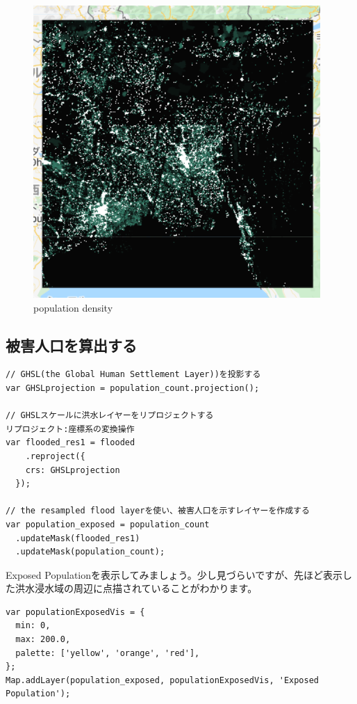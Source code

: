 \documentclass[
]{book}
\begin{document}
\begin{figure}
\centering
\includegraphics{images/population.png}
\caption{population density}
\end{figure}

\hypertarget{ux88abux5bb3ux4ebaux53e3ux3092ux7b97ux51faux3059ux308b}{%
\subsection{被害人口を算出する}\label{ux88abux5bb3ux4ebaux53e3ux3092ux7b97ux51faux3059ux308b}}

\begin{verbatim}
// GHSL(the Global Human Settlement Layer))を投影する
var GHSLprojection = population_count.projection();

// GHSLスケールに洪水レイヤーをリプロジェクトする
リプロジェクト:座標系の変換操作
var flooded_res1 = flooded
    .reproject({
    crs: GHSLprojection
  });

// the resampled flood layerを使い、被害人口を示すレイヤーを作成する
var population_exposed = population_count
  .updateMask(flooded_res1)
  .updateMask(population_count);
\end{verbatim}

Exposed Populationを表示してみましょう。少し見づらいですが、先ほど表示した洪水浸水域の周辺に点描されていることがわかります。

\begin{verbatim}
var populationExposedVis = {
  min: 0,
  max: 200.0,
  palette: ['yellow', 'orange', 'red'],
};
Map.addLayer(population_exposed, populationExposedVis, 'Exposed Population');
\end{verbatim}
\end{document}
